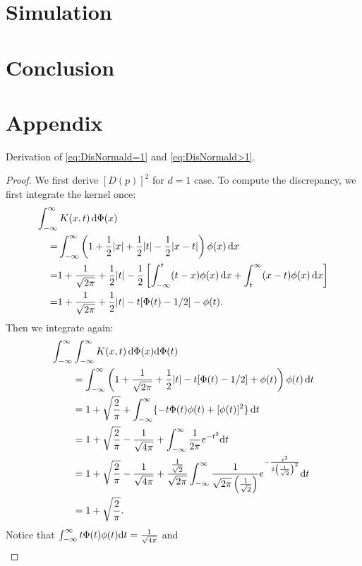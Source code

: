 \documentclass[graybox]{svmult}
\newcommand{\dif}{{\rm d}}
\begin{document}
\section{Simulation}

\section{Conclusion}

\section*{Appendix}
Derivation of \eqref{eq:DisNormald=1} and \eqref{eq:DisNormald>1}. 
\begin{proof}
We first derive $[D(p)]^2$ for $d=1$ case. 
To compute the discrepancy, we first integrate the kernel once:
\begin{align*}
\MoveEqLeft{\int_{-\infty}^\infty K(x,t) \, \dif \Phi(x)}\\
=&\int_{-\infty}^{\infty} \left(1+\frac{1}{2}|x|+\frac{1}{2}|t|-\frac{1}{2}|x-t|\right)\phi(x) \, \dif x\\
=& 1+ \frac{1}{\sqrt{2\pi}} + \frac{1}{2}|t|-\frac{1}{2}\left[\int_{-\infty}^{t}(t-x)\phi(x) \, \dif x+\int_{t}^{\infty} (x-t)\phi(x) \, \dif x\right]\\
=& 1+ \frac{1}{\sqrt{2\pi}} + \frac{1}{2}|t| - t [\Phi(t)-1/2] - \phi(t) .
\end{align*}
Then we integrate again:
\begin{align*}
\MoveEqLeft{\int_{-\infty}^\infty \int_{-\infty}^\infty K(x,t) \, \dif \Phi(x) \dif \Phi(t)}\\
& =  \int_{-\infty}^{\infty} \left( 1+\frac{1}{\sqrt{2\pi}} + \frac{1}{2}|t| - t [\Phi(t)-1/2] + \phi(t)\right)\phi(t) \, \dif t\\
&= 1+ \sqrt{\frac{2}{\pi}} + \int_{-\infty}^{\infty} \{ - t \Phi(t)\phi(t)  +  [\phi(t)]^2 \} \, \dif t\\
&= 1+\sqrt{\frac{2}{\pi}}-\frac{1}{\sqrt{4\pi}}+\int_{-\infty}^{\infty}\frac{1}{2\pi}e^{-t^2}\dif t\\
&= 1+\sqrt{\frac{2}{\pi}}-\frac{1}{\sqrt{4\pi}}+\frac{\frac{1}{\sqrt{2}}}{\sqrt{2\pi}}\int_{-\infty}^{\infty}\frac{1}{\sqrt{2\pi}\left(\frac{1}{\sqrt{2}}\right)}e^{-\frac{t^2}{2\left(\frac{1}{\sqrt{2}}\right)^2}}\dif t\\
&=1+\sqrt{\frac{2}{\pi}}. 
\end{align*}
Notice that $\int_{-\infty}^{\infty} t\Phi(t)\phi(t)\dif t = \frac{1}{\sqrt{4\pi}}$ and 
\begin{eqnarray*}

\end{eqnarray*}
\end{proof}
\end{document}
